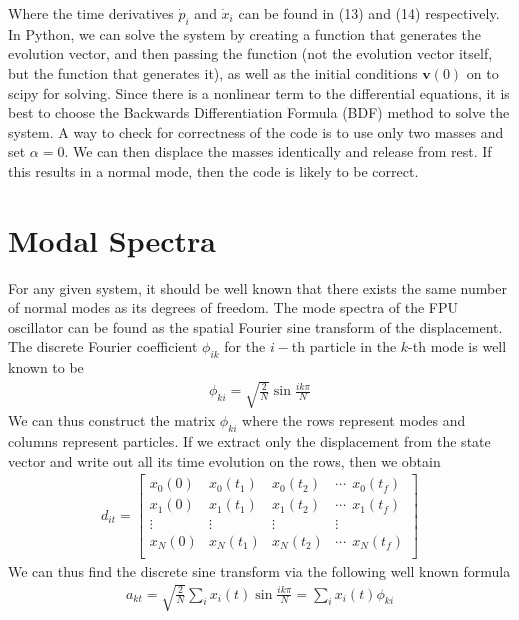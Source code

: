 \documentclass{article}
\newcommand{\ve}{\mathbf}
\begin{document}
Where the time derivatives $\dot{p}_i$ and $\dot{x}_i$ can be found in (13) and (14) respectively. In Python, 
we can solve the system by creating a function that generates the evolution vector, 
and then passing the function (not the evolution vector itself, but the function that generates it), as well as the initial conditions 
$\ve{v}(0)$ on to 
scipy for solving. Since there is a nonlinear term to the differential equations, 
it is best to choose the Backwards Differentiation Formula (BDF) method to solve the system. 
A way to check for correctness of the code is to use only two masses and set 
$\alpha=0$. We can then 
displace the masses identically and release from rest. If this results in a normal mode, then the code is likely to be correct.

\section{Modal Spectra}
For any given system, it should be well known that there exists the same number of normal modes 
as its degrees of freedom. The mode spectra of the FPU oscillator can be found as the spatial Fourier sine 
transform of the displacement. The discrete Fourier coefficient $\phi_{ik}$ for the 
$i-$th particle in the $k$-th mode is well known to be 
\begin{align}
    \phi_{ki}=\sqrt{\frac{2}{N}}\sin\frac{ik\pi}{N}
\end{align}
We can thus construct the matrix $\phi_{ki}$ where the rows represent modes and 
columns represent particles. If we extract only the displacement from the state vector
and write out all its time evolution on the rows, then we obtain 
\begin{align}
    d_{it}=\begin{bmatrix}
        x_0(0)& x_0(t_1) & x_0(t_2) &\cdots \ \  x_0(t_f)\\ 
        x_1(0)& x_1(t_1) & x_1(t_2) &\cdots \ \  x_1(t_f)\\ 
       \vdots& \vdots & \vdots & \vdots\\ 
        x_N(0)& x_N(t_1) & x_N(t_2) &\cdots \ \ x_N(t_f)\\ 
    \end{bmatrix}
\end{align} 
We can thus find the discrete sine transform via the following well known formula 
\begin{align}
    a_{kt}=\sqrt{\frac{2}{N}}\sum_ix_i(t)\sin{\frac{ik\pi}{N}}=\sum_ix_{i}(t)\phi_{ki}
\end{align}
\end{document}
